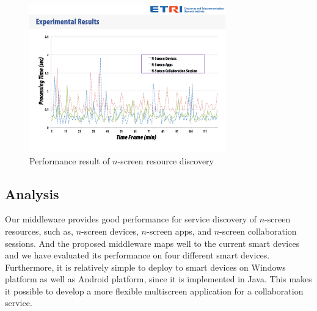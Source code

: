 \documentclass[conference]{IEEEtran}
\begin{document}
    \begin{table}[htb]
    \caption{Test Setup for Performance Evaluation}
    \label{tlb:setup}
    \end{table}

    \begin{figure}[htb] %
    \centering
    \includegraphics[width=8.5cm,keepaspectratio]{performance}
    \caption{Performance result of $n$-screen resource discovery}
    \label{fig:performance}
    \end{figure}


\subsection{ Analysis} 
Our middleware provides good performance for service discovery of $n$-screen resources, such as, $n$-screen devices, $n$-screen apps, and $n$-screen collaboration sessions.
    And the proposed middleware maps well to the current smart devices and we have evaluated its performance on four different smart devices.
    Furthermore, it is relatively simple to deploy to smart devices on Windows platform as well as Android platform, since it is implemented in Java.
This makes it possible to develop a more flexible multiscreen application for a collaboration service. \\
\end{document}
